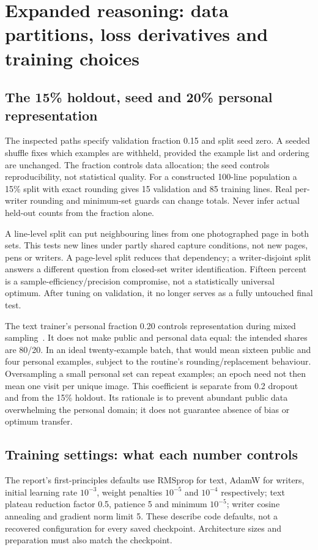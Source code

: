 \section{Expanded reasoning: data partitions, loss derivatives and training choices}
\label{sec:expand-train}
\subsection{The 15\% holdout, seed and 20\% personal representation}
The inspected paths specify validation fraction 0.15 and split seed zero.
A seeded shuffle fixes which examples are withheld, provided the example
list and ordering are unchanged. The fraction controls data allocation;
the seed controls reproducibility, not statistical quality. For a constructed
100-line population a 15\% split with exact rounding gives 15 validation
and 85 training lines. Real per-writer rounding and minimum-set guards can
change totals. Never infer actual held-out counts from the fraction alone.

A line-level split can put neighbouring lines from one photographed page
in both sets. This tests new lines under partly shared capture conditions,
not new pages, pens or writers. A page-level split reduces that dependency;
a writer-disjoint split answers a different question from closed-set writer
identification. Fifteen percent is a sample-efficiency/precision compromise,
not a statistically universal optimum. After tuning on validation, it no
longer serves as a fully untouched final test.

The text trainer's personal fraction 0.20 controls representation during
mixed sampling~\cite{code2026}. It does not make public and personal data
equal: the intended shares are 80/20. In an ideal twenty-example batch,
that would mean sixteen public and four personal examples, subject to the
routine's rounding/replacement behaviour. Oversampling a small personal set
can repeat examples; an epoch need not then mean one visit per unique image.
This coefficient is separate from 0.2 dropout and from the 15\% holdout.
Its rationale is to prevent abundant public data overwhelming the personal
domain; it does not guarantee absence of bias or optimum transfer.

\subsection{Training settings: what each number controls}
The report's first-principles defaults use RMSprop for text, AdamW for
writers, initial learning rate $10^{-3}$, weight penalties $10^{-5}$ and
$10^{-4}$ respectively; text plateau reduction factor 0.5, patience 5 and
minimum $10^{-5}$; writer cosine annealing and gradient norm limit 5.
These describe code defaults, not a recovered configuration for every saved
checkpoint. Architecture sizes and preparation must also match the checkpoint.

